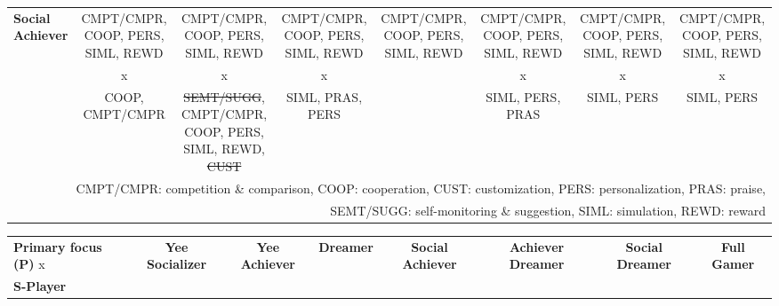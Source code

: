 \begin{landscape}
\begin{quadro}[htb]
\begin{tabular}{|l|c|c|c|c|c|c|c|}
\multirow{3}{*}{\textbf{Social Achiever}}& 
\multicolumn{1}{|p{2.5cm}|}{\centering CMPT/CMPR, COOP, PERS, SIML, REWD}&%
\multicolumn{1}{|p{2.5cm}|}{\centering CMPT/CMPR, COOP, PERS, SIML, REWD}&%
\multicolumn{1}{|p{2.5cm}|}{\centering CMPT/CMPR, COOP, PERS, SIML, REWD}&%
\multicolumn{1}{|p{2.5cm}|}{\centering CMPT/CMPR, COOP, PERS, SIML, REWD}&%
\multicolumn{1}{|p{2.5cm}|}{\centering CMPT/CMPR, COOP, PERS, SIML, REWD}&%
\multicolumn{1}{|p{2.5cm}|}{\centering CMPT/CMPR, COOP, PERS, SIML, REWD}&%
\multicolumn{1}{|p{2.5cm}|}{\centering CMPT/CMPR, COOP, PERS, SIML, REWD}\tabularnewline
& 
\multicolumn{1}{|p{2.5cm}|}{\centering x}&
\multicolumn{1}{|p{2.5cm}|}{\centering x}&
\multicolumn{1}{|p{2.5cm}|}{\centering x}&
&
\multicolumn{1}{|p{2.5cm}|}{\centering x}&
\multicolumn{1}{|p{2.5cm}|}{\centering x}&
\multicolumn{1}{|p{2.5cm}|}{\centering x}\tabularnewline
& 
\multicolumn{1}{|p{2.5cm}|}{\centering COOP, CMPT/CMPR}&%
\multicolumn{1}{|p{2.5cm}|}{\centering \mbox{\st{SEMT/SUGG}}, \mbox{CMPT/CMPR}, COOP, PERS, SIML, REWD, \st{CUST}}&%
\multicolumn{1}{|p{2.5cm}|}{\centering SIML, PRAS, PERS}&%
&%
\multicolumn{1}{|p{2.5cm}|}{\centering SIML, PERS, PRAS}&%
\multicolumn{1}{|p{2.5cm}|}{\centering SIML, PERS}&%
\multicolumn{1}{|p{2.5cm}|}{\centering SIML, PERS}\tabularnewline
\hline
\multicolumn{8}{r}{CMPT/CMPR: competition \& comparison, COOP: cooperation, CUST: customization, PERS: personalization, PRAS: praise,}\tabularnewline
\multicolumn{8}{r}{SEMT/SUGG: self-monitoring \& suggestion, SIML: simulation, REWD: reward}
\end{tabular}
\fautor
\end{quadro}

\newpage

\centering
\tiny
\begin{tabular}{|l|c|c|c|c|c|c|c|}
\hline
\multirow{1}{*}{\textbf{Primary focus (P)} x}&
\multirow{2}{*}{\textbf{Yee Socializer}}&
\multirow{2}{*}{\textbf{Yee Achiever}}&
\multirow{2}{*}{\textbf{Dreamer}}&
\multirow{2}{*}{\textbf{Social Achiever}}&
\multirow{2}{*}{\textbf{Achiever Dreamer}}&
\multirow{2}{*}{\textbf{Social Dreamer}}&
\multirow{2}{*}{\textbf{Full Gamer}}\tabularnewline
\multirow{1}{*}{\textbf{S-Player}}&
&
&
&
&
&
&
\tabularnewline
\hline\hline
%


\end{tabular}
\end{landscape}
